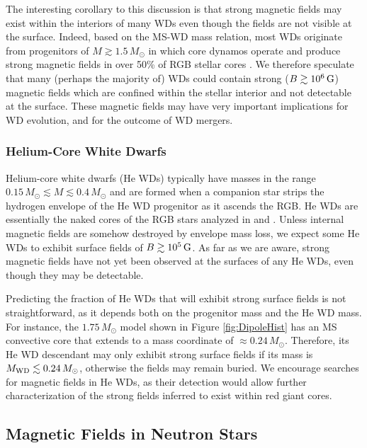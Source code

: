 The interesting corollary to this discussion is that strong magnetic fields may exist within the interiors of many WDs even though the fields are not visible at the surface. Indeed, based on the MS-WD mass relation, most WDs originate from progenitors of $M \gtrsim 1.5 \, M_\odot$ in which core dynamos operate and produce strong magnetic fields in over 50\% of RGB stellar cores \citep{Stello_2016}. We therefore speculate that many (perhaps the majority of) WDs could contain strong ($B \gtrsim 10^6 \, {\rm G}$) magnetic fields which are confined within the stellar interior and not detectable at the surface. These magnetic fields may have very important implications for WD evolution, and for the outcome of WD mergers. 


\subsubsection{Helium-Core White Dwarfs}

Helium-core white dwarfs (He WDs) typically have masses in the range $0.15 \, M_\odot \lesssim M \lesssim 0.4 \, M_\odot$ and are formed when a companion star strips the hydrogen envelope of the He WD progenitor as it ascends the RGB. He WDs are essentially the naked cores of the RGB stars analyzed in \cite{Fuller_2015} and \cite{Stello_2016}. Unless internal magnetic fields are somehow destroyed by envelope mass loss, we expect some He WDs to exhibit surface fields of $B \gtrsim 10^5 \, {\rm G}$. As far as we are aware, strong magnetic fields have not yet been observed at the surfaces of any He WDs, even though they may be detectable.

Predicting the fraction of He WDs that will exhibit strong surface fields is not straightforward, as it depends both on the progenitor mass and the He WD mass. For instance, the $1.75 \, M_\odot$ model shown in Figure \ref{fig:DipoleHist} has an MS convective core that extends to a mass coordinate of $\approx 0.24 \, M_\odot$. Therefore, its He WD descendant may only exhibit strong surface fields if its mass is $M_{\rm WD} \lesssim 0.24 \, M_\odot$, otherwise the fields may remain buried. We encourage searches for magnetic fields in He WDs, as their detection would allow further characterization of the strong fields inferred to exist within red giant cores.



\subsection{Magnetic Fields in Neutron Stars}

